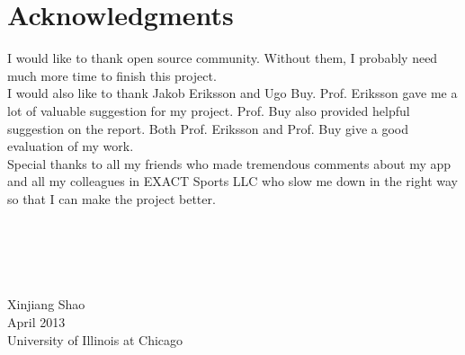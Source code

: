 \clearpage
{}
\chapter*{Acknowledgments}
\vspace{1.0in}

I would like to thank open source community. Without them, I probably need much more time to finish this project. \\

I would also like to thank Jakob Eriksson and Ugo Buy. Prof. Eriksson gave me a lot of valuable suggestion for my project.  Prof. Buy also provided helpful suggestion on the report. Both Prof. Eriksson and Prof. Buy give a good evaluation of my work. \\

Special thanks to all my friends who made tremendous comments about my app and all my colleagues in EXACT Sports LLC who slow me down in the right way so that I can make the project better. \\

\leavevmode
\\
\\
\\
\\
\\
Xinjiang Shao \\
{April 2013}\\
{University of Illinois at Chicago}\\
\newpage
